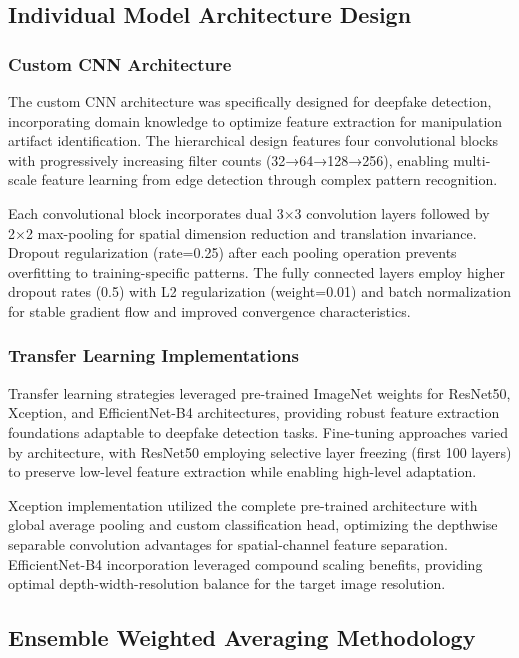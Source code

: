 \documentclass[conference]{IEEEtran}
\begin{document}
\subsection{Individual Model Architecture Design}

\subsubsection{Custom CNN Architecture}

The custom CNN architecture was specifically designed for deepfake detection, incorporating domain knowledge to optimize feature extraction for manipulation artifact identification. The hierarchical design features four convolutional blocks with progressively increasing filter counts (32→64→128→256), enabling multi-scale feature learning from edge detection through complex pattern recognition.

Each convolutional block incorporates dual 3×3 convolution layers followed by 2×2 max-pooling for spatial dimension reduction and translation invariance. Dropout regularization (rate=0.25) after each pooling operation prevents overfitting to training-specific patterns. The fully connected layers employ higher dropout rates (0.5) with L2 regularization (weight=0.01) and batch normalization for stable gradient flow and improved convergence characteristics.

\subsubsection{Transfer Learning Implementations}

Transfer learning strategies leveraged pre-trained ImageNet weights for ResNet50, Xception, and EfficientNet-B4 architectures, providing robust feature extraction foundations adaptable to deepfake detection tasks. Fine-tuning approaches varied by architecture, with ResNet50 employing selective layer freezing (first 100 layers) to preserve low-level feature extraction while enabling high-level adaptation.

Xception implementation utilized the complete pre-trained architecture with global average pooling and custom classification head, optimizing the depthwise separable convolution advantages for spatial-channel feature separation. EfficientNet-B4 incorporation leveraged compound scaling benefits, providing optimal depth-width-resolution balance for the target image resolution.

\subsection{Ensemble Weighted Averaging Methodology}
\end{document}
